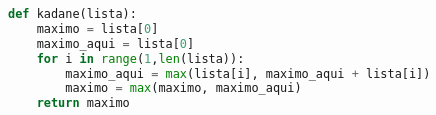 \begin{lstlisting}[language = Python]
def kadane(lista):
	maximo = lista[0]
	maximo_aqui = lista[0] 
	for i in range(1,len(lista)):
		maximo_aqui = max(lista[i], maximo_aqui + lista[i])
		maximo = max(maximo, maximo_aqui)   
	return maximo
\end{lstlisting}